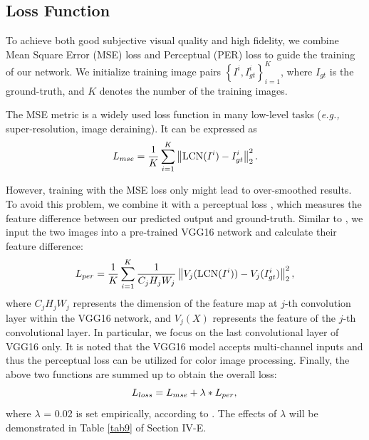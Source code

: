 \documentclass[journal]{IEEEtran}
\begin{document}
 \subsection{Loss Function}
To achieve both good subjective visual quality and high fidelity, we combine Mean Square Error (MSE) loss and Perceptual (PER) loss to guide the training of our network. We initialize training image pairs \(\left \{ I^{i}, I_{gt}^{i}\right \}_{i=1}^{K}\), where \(I_{gt}\) is the ground-truth, and \(K\) denotes the number of the training images.

The MSE metric is a widely used loss function in many low-level tasks (\textit{e.g.,} super-resolution, image deraining). It can be expressed as  
\begin{equation}
 L_{mse}=\frac{1}{K}\sum_{i=1}^{K}\left \| {\rm LCN}(I^{i}) - I_{gt}^{i} \right \|_{2}^{2}.
\end{equation}

However, training with the MSE loss only might lead to over-smoothed results. To avoid this problem, we combine it with a perceptual loss \cite{johnson2016perceptual}, which measures the feature difference between our predicted output and ground-truth. Similar to \cite{water-net,johnson2016perceptual}, we input the two images into a pre-trained VGG16 \cite{VGG16} network and calculate their feature difference:
\begin{equation}
\begin{aligned}
  L_{per} &=\frac{1}{K} \sum_{i=1}^{K}\frac{1}{C_{j} H_{j}W_{j}} \left \|V_{j} ({\rm LCN}(I^{i})) - V_{j}(I_{gt}^{i})\right \|_{2}^{2},\\
 \end{aligned}
\end{equation}
where \(C_{j}\)\(H_{j}\)\(W_{j}\) represents the dimension of the feature map at
\(j\)-th convolution layer within the VGG16 network, and \(V_{j}(X)\) represents the feature of the \(j\)-th convolutional layer. In particular, we focus on the last convolutional layer of VGG16 only. It is noted that the VGG16 model accepts multi-channel inputs and thus the perceptual loss can be utilized for color image processing. Finally, the above two functions are summed up to obtain the overall loss:
\begin{equation}
 L_{loss} = L_{mse} + \lambda *L_{per},\\
\end{equation}
where \(\lambda\) = 0.02 is set empirically, according to \cite{dehazeli2018single}. The effects of \(\lambda\) will be demonstrated in Table \ref{tab9} of Section IV-E.
\end{document}
